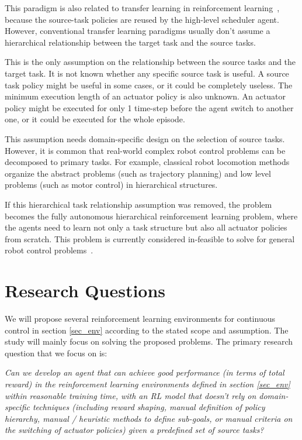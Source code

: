 This paradigm is also related to transfer learning in reinforcement learning~\cite{taylor2009transfer}, because the source-task policies are reused by the high-level scheduler agent. However, conventional transfer learning paradigms usually don't assume a hierarchical relationship between the target task and the source tasks.

This is the only assumption on the relationship between the source tasks and the target task. It is not known whether any specific source task is useful. A source task policy might be useful in some cases, or it could be completely useless. The minimum execution length of an actuator policy is also unknown. An actuator policy might be executed for only 1 time-step before the agent switch to another one, or it could be executed for the whole episode.

This assumption needs domain-specific design on the selection of source tasks. However, it is common that real-world complex robot control problems can be decomposed to primary tasks. For example, classical robot locomotion methods organize the abstract problems (such as trajectory planning) and low level problems (such as motor control) in hierarchical structures.

If this hierarchical task relationship assumption was removed, the problem becomes the fully autonomous hierarchical reinforcement learning problem, where the agents need to learn not only a task structure but also all actuator policies from scratch. This problem is currently considered in-feasible to solve for general robot control problems~\cite{barto2003recent}.


\section{Research Questions}


We will propose several reinforcement learning environments for continuous control in section \ref{sec_env} according to the stated scope and assumption. The study will mainly focus on solving the proposed problems.
The primary research question that we focus on is:
\begin{center}
    \textit{Can we develop an agent that can achieve good performance (in terms of total reward) in the reinforcement learning environments defined in section \ref{sec_env} within reasonable training time, with an RL model that doesn't rely on domain-specific techniques  (including reward shaping, manual definition of policy hierarchy, manual / heuristic methods to define sub-goals, or manual criteria on the switching of actuator policies) given a predefined set of source tasks?}
\end{center}

